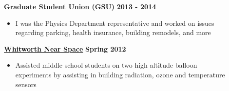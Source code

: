 \documentclass[margin]{res}
\begin{document}
\begin{resume}
{\bf Graduate Student Union (GSU)} \hfill {\bf 2013 - 2014}
    \begin{itemize}\itemsep -2pt
    \item[] I was the Physics Department representative and worked on issues \\regarding parking, health insurance, building remodels, and more
    \end{itemize} \vspace{-12pt}
{\bf\href{http://www.whitworthnearspace.org/wiki/Main_Page}{Whitworth Near Space}} \hfill  \textbf{Spring 2012} 
    \begin{itemize}\itemsep -2pt
    \item[] Assisted middle school students on two high altitude balloon \\experiments by assisting in building radiation, ozone and temperature \\sensors

\end{itemize}
\end{resume}
\end{document}
